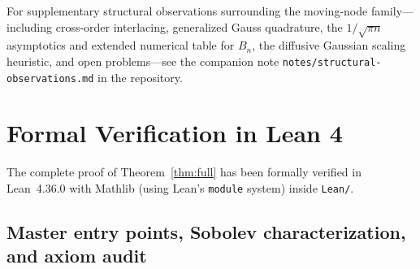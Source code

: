 \documentclass[11pt,a4paper]{article}
\newcommand{\code}[1]{\nolinkurl{#1}}
\theoremstyle{remark}
\numberwithin{equation}{section}
\begin{document}
For supplementary structural observations surrounding the moving-node family—including cross-order interlacing, generalized Gauss quadrature, the $1/\sqrt{\pi n}$ asymptotics and extended numerical table for $B_n$, the diffusive Gaussian scaling heuristic, and open problems—see the companion note \code{notes/structural-observations.md} in the repository.

\section{Formal Verification in Lean 4}
\label{sec:lean}

The complete proof of Theorem~\ref{thm:full} has been formally verified in Lean~4.36.0 with Mathlib (using Lean's \code{module} system) inside \code{Lean/}.

\subsection{Master entry points, Sobolev characterization, and axiom audit}
\end{document}

